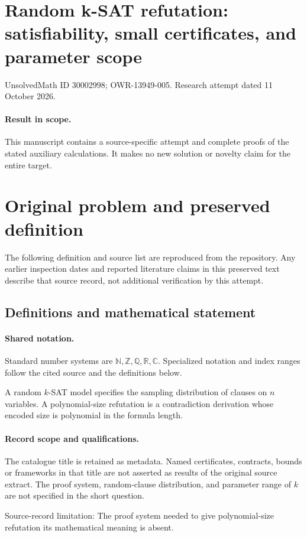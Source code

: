 \documentclass[11pt]{article}
\begin{document}
\section*{Random k-SAT refutation: satisfiability, small certificates, and parameter scope}
\noindent UnsolvedMath ID 30002998; OWR-13949-005. Research attempt dated 11 October 2026.
\paragraph{Result in scope.}This manuscript contains a source-specific attempt and complete proofs of the stated auxiliary calculations. It makes no new solution or novelty claim for the entire target.
\section{Original problem and preserved definition}
The following definition and source list are reproduced from the repository. Any earlier inspection dates and reported literature claims in this preserved text describe that source record, not additional verification by this attempt.
\subsection{Definitions and mathematical statement}

\paragraph{Shared notation.}Standard number systems are $\mathbb N,\mathbb Z,\mathbb Q,\mathbb R,\mathbb C$. Specialized notation and index ranges follow the cited source and the definitions below.


A random $k$-SAT model specifies the sampling distribution of clauses on $n$ variables. A polynomial-size refutation is a contradiction derivation whose encoded size is polynomial in the formula length.
\paragraph{Record scope and qualifications.}
The catalogue title is retained as metadata. Named certificates, contracts, bounds or frameworks in that title are not asserted as results of the original source extract.
The proof system, random-clause distribution, and parameter range of $k$ are not specified in the short question.

Source-record limitation: The proof system needed to give polynomial-size refutation its mathematical meaning is absent.
\end{document}
